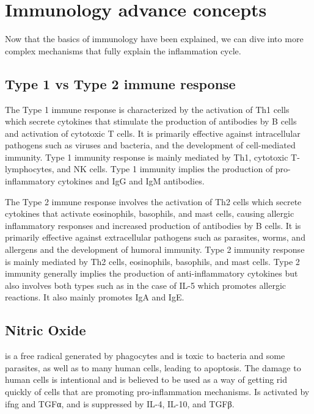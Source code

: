 \section{Immunology advance concepts}

Now that the basics of immunology have been explained, we can dive into more complex mechanisms that fully explain the inflammation cycle.

\subsection{Type 1 vs Type 2 immune response}

The Type 1 immune response is characterized by the activation of Th1 cells which secrete cytokines that stimulate the production of antibodies by B cells and activation of cytotoxic T cells. It is primarily effective against intracellular pathogens such as viruses and bacteria, and the development of cell-mediated immunity. Type 1 immunity response is mainly mediated by Th1, cytotoxic T-lymphocytes, and NK cells. Type 1 immunity implies the production of pro-inflammatory cytokines and IgG and IgM antibodies.

The Type 2 immune response involves the activation of Th2 cells which secrete cytokines that activate eosinophils, basophils, and mast cells, causing allergic inflammatory responses and increased production of antibodies by B cells. It is primarily effective against extracellular pathogens such as parasites, worms, and allergens and the development of humoral immunity. Type 2 immunity response is mainly mediated by Th2 cells, eosinophils, basophils, and mast cells. Type 2 immunity generally implies the production of anti-inflammatory cytokines but also involves both types such as in the case of IL-5 which promotes allergic reactions. It also mainly promotes IgA and IgE.


\subsection{Nitric Oxide}
\label{in:NO}

 is a free radical generated by phagocytes and is toxic to bacteria and some parasites, as well as to many human cells, leading to apoptosis. The damage to human cells is intentional and is believed to be used as a way of getting rid quickly of cells that are promoting pro-inflammation mechanisms. Is activated by \gls{ifng} and TGFα, and is suppressed by IL-4, IL-10, and TGFβ.

